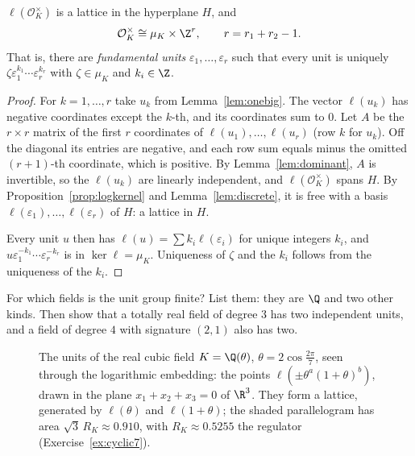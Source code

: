 \begin{theorem}\label{thm:dirichlet}
$\ell(\mathcal O_K^\times)$ is a lattice in the hyperplane $H$, and
\[
\mathcal O_K^\times\cong\mu_K\times\Z^{r},\qquad r=r_1+r_2-1.
\]
That is, there are \emph{fundamental units} $\varepsilon_1,\dots,\varepsilon_r$ such that every unit is uniquely
$\zeta\varepsilon_1^{k_1}\cdots\varepsilon_r^{k_r}$ with $\zeta\in\mu_K$ and $k_i\in\Z$.
\end{theorem}
\begin{proof}
For $k=1,\dots,r$ take $u_k$ from Lemma~\ref{lem:onebig}. The vector $\ell(u_k)$ has negative coordinates except the $k$-th,
and its coordinates sum to $0$. Let $A$ be the $r\times r$ matrix of the first $r$ coordinates of $\ell(u_1),\dots,
\ell(u_r)$ (row $k$ for $u_k$). Off the diagonal its entries are negative, and each row sum equals minus the omitted
$(r+1)$-th coordinate, which is positive. By Lemma~\ref{lem:dominant}, $A$ is invertible, so the $\ell(u_k)$ are linearly
independent, and $\ell(\mathcal O_K^\times)$ spans $H$. By Proposition~\ref{prop:logkernel} and Lemma~\ref{lem:discrete},
it is free with a basis $\ell(\varepsilon_1),\dots,\ell(\varepsilon_r)$ of $H$: a lattice in $H$.

Every unit $u$ then has $\ell(u)=\sum k_i\ell(\varepsilon_i)$ for unique integers $k_i$, and $u\varepsilon_1^{-k_1}\cdots
\varepsilon_r^{-k_r}$ is in $\ker\ell=\mu_K$. Uniqueness of $\zeta$ and the $k_i$ follows from the uniqueness of the $k_i$.
\end{proof}

\begin{think}
For which fields is the unit group finite? List them: they are $\Q$ and two other kinds. Then show that a totally real
field of degree $3$ has two independent units, and a field of degree $4$ with signature $(2,1)$ also has two.
\end{think}

\begin{figure}[ht]
\centering
{}
\caption{The units of the real cubic field $K=\Q(\theta)$, $\theta=2\cos\frac{2\pi}7$, seen through the logarithmic
embedding: the points $\ell(\pm\theta^a(1+\theta)^b)$, drawn in the plane $x_1+x_2+x_3=0$ of $\R^3$. They form a lattice,
generated by $\ell(\theta)$ and $\ell(1+\theta)$; the shaded parallelogram has area $\sqrt3\,R_K\approx0.910$, with
$R_K\approx0.5255$ the regulator (Exercise~\ref{ex:cyclic7}).}
\label{fig:loglattice}
\end{figure}

